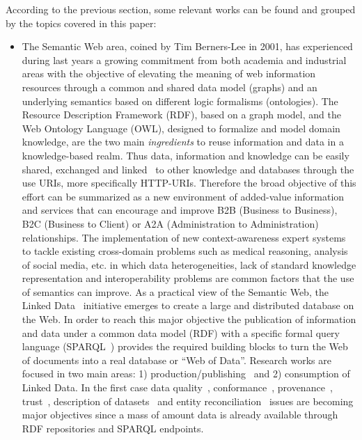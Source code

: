According to the previous section, some relevant works can be found and grouped by the topics covered in this paper:

\begin{itemize}
 \item  The Semantic Web area, coined by Tim Berners-Lee in 2001, has experienced during last years a growing 
 commitment from both academia and industrial areas  with the objective of elevating the meaning of web 
 information resources through a common and shared data model (graphs) and an underlying semantics based 
 on different logic formalisms (ontologies). The Resource Description Framework (RDF), based on a graph model, and the Web Ontology Language (OWL), designed to formalize and model domain knowledge, are the two main \textit{ingredients} to reuse information and data 
 in a knowledge-based realm. Thus data, information and knowledge can be easily shared, exchanged and linked~\cite{Maali_Cyganiak_2011} 
 to other knowledge and databases through the use URIs, more specifically HTTP-URIs. Therefore the broad objective of this effort can be summarized 
 as a new environment of added-value information and services that can encourage and improve B2B (Business to Business), B2C (Business to Client) or 
 A2A (Administration to Administration) relationships. The implementation of new context-awareness expert systems to tackle existing 
 cross-domain problems such as medical reasoning, analysis of social media, etc. in which data heterogeneities, 
 lack of standard knowledge representation and interoperability problems are common factors that the use of semantics can improve. As a practical view of the Semantic Web, 
 the Linked Data~\cite{Berners-Lee-2006,Heath_Bizer_2011} initiative emerges to create a large and distributed database on the Web. 
 In order to reach this major objective the publication of information and data under a common data model (RDF) 
 with a specific formal query language (SPARQL~\cite{Sparql11}) provides the required building blocks to turn the Web of documents 
 into a real database or ``Web of Data''. Research works are focused in two main areas: 1) production/publishing~\cite{bizer07how} and 2) consumption of 
 Linked Data. In the first case data quality~\cite{bizer2007,Bizer2009QA,lodq,link-qa}, conformance~\cite{DBLP:journals/ws/HoganUHCPD12}, 
 provenance~\cite{w3c-prov,DBLP:conf/ipaw/HartigZ10}, trust~\cite{Carroll05namedgraphs}, description of 
 datasets~\cite{void,Cyganiak08semanticsitemaps,ckanValidator} and entity reconciliation~\cite{Serimi,Maali_Cyganiak_2011} issues are 
 becoming major objectives since a mass of amount data is already available through RDF repositories and SPARQL endpoints. 
 

\end{itemize}
